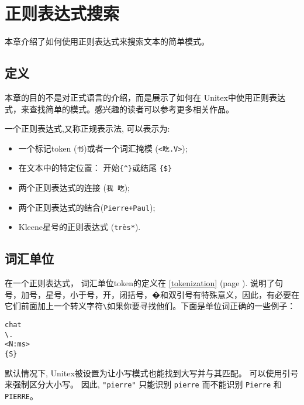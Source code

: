\chapter{正则表达式搜索}
\label{chap-regexp}

本章介绍了如何使用正则表达式来搜索文本的简单模式。

\section{定义}

本章的目的不是对正式语言的介绍，而是展示了如何在 Unitex中使用正则表达式，来查找简单的模式。感兴趣的读者可以参考更多相关作品。


\bigskip \noindent 一个正则表达式,又称正规表示法, 可以表示为:

\begin{itemize}
  \item 一个标记token (\verb+书+)或者一个词汇掩模
  (\verb+<吃.V>+);
  \item 在文本中的特定位置： 开始\verb+{^}+或结尾 \verb+{$}+
  \item 两个正则表达式的连接 (\verb+我 吃+);
  \item 两个正则表达式的结合(\verb$Pierre+Paul$); 
  \item Kleene星号的正则表达式 (\verb+très*+).
\end{itemize}


\section{词汇单位}

在一个正则表达式， 词汇单位token的定义在 \ref{tokenization}
(page \pageref{tokenization}). 说明了句号，加号，星号，小于号，开，闭括号，�和双引号有特殊意义，因此，有必要在它们前面加上一个转义字符\verb+\+如果你要寻找他们。下面是单位词正确的一些例子：\index{\verb+\+}

\begin{verbatim}
chat
\.
<N:ms>
{S}
\end{verbatim}

\noindent  默认情况下, Unitex被设置为让小写模式也能找到大写并与其匹配。 可以使用引号来强制区分大小写。
因此, \verb+"pierre"+ 只能识别 \verb+pierre+ 而不能识别 \verb+Pierre+ 和 \verb+PIERRE+。

